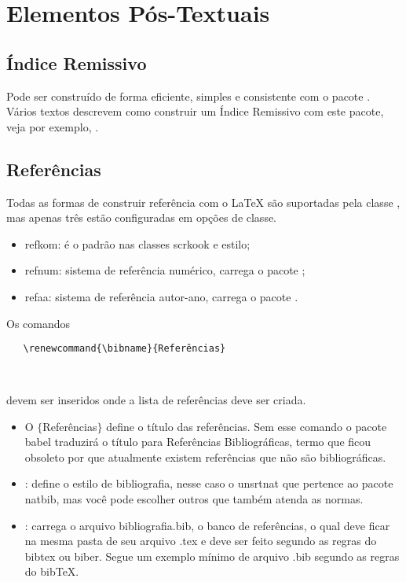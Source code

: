 
\chapter{Elementos Pós-Textuais}

\section{Índice Remissivo}

Pode ser construído de forma eficiente, simples e consistente com
o pacote . Vários textos descrevem como construir
um Índice Remissivo com este pacote, veja por exemplo,
.

\section{Referências}

Todas as formas de construir referência com o \LaTeX{} são suportadas
pela classe \estilo, mas apenas três estão configuradas em opções de classe.
\begin{itemize}
	\item{\negri refkom}: é o padrão nas classes scrkook e estilo;
	\item{\negri refnum}: sistema de referência numérico, carrega o pacote
	;
	\item{\negri refaa}: sistema de referência autor-ano, carrega o pacote
	.
\end{itemize}

Os comandos
\begin{tcolorbox}
\begin{lstlisting}
   \renewcommand{\bibname}{Referências}
   
   
\end{lstlisting}
\end{tcolorbox}
devem ser inseridos onde a lista de referências deve ser criada.
\begin{itemize}
\item O $\{$Referências$\}$ define o
   título das referências. Sem esse comando o pacote babel traduzirá
   o título para Referências Bibliográficas, termo que ficou obsoleto
   por que atualmente existem referências que não são bibliográficas.
\item {}: define o estilo de bibliografia, nesse 
caso o \textsf{unsrtnat} que pertence ao pacote natbib, mas você pode escolher 
outros que também atenda as normas.
\item {}: carrega o arquivo
   bibliografia.bib, o banco de referências, o qual deve ficar
   na mesma pasta de seu arquivo .tex e deve ser feito segundo
   as regras do bibtex ou biber. Segue um exemplo mínimo de
   arquivo .bib segundo as regras do bib\TeX.
\end{itemize}

